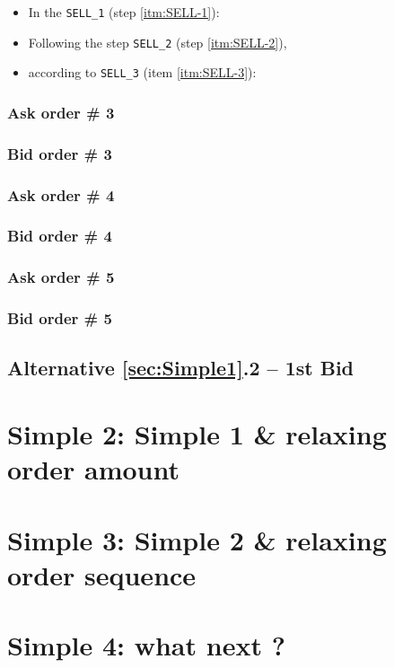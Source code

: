 \documentclass[a4paper,11pt]{article}
\begin{document}
\begin{itemize}
    \item  In the {\tt SELL\_1} (step \ref{itm:SELL-1}):
    	
    \item Following the step {\tt SELL\_2} (step \ref{itm:SELL-2}), 
	
    \item according to {\tt SELL\_3} (item \ref{itm:SELL-3}):

\end{itemize}

	
\subsubsection{Ask order \# 3} 
	
\subsubsection{Bid order \# 3} 
	
\subsubsection{Ask order \# 4}
	
\subsubsection{Bid order \# 4}
	
\subsubsection{Ask order \# 5} 
	
\subsubsection{Bid order \# 5} 

\subsection{Alternative \ref{sec:Simple1}.2 -- 1st Bid}




\section{Simple 2: Simple 1 \& relaxing order amount}
\section{Simple 3: Simple 2 \& relaxing order sequence}
\section{Simple 4: what next ?}
\end{document}
